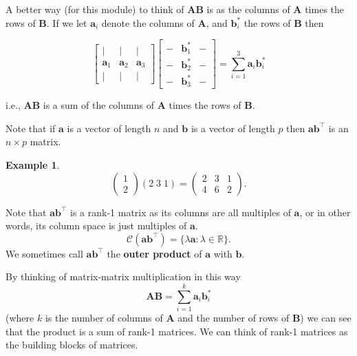 \documentclass[
]{book}
\theoremstyle{definition}
\theoremstyle{definition}
\newtheorem{example}{Example}[chapter]
\theoremstyle{definition}
\theoremstyle{definition}
\theoremstyle{remark}
\begin{document}
A better way (for this module) to think of \(\mathbf A\mathbf B\) is as the columns of \(\mathbf A\) times the rows of \(\mathbf B\). If we let \(\mathbf a_i\) denote the columns of \(\mathbf A\), and \(\mathbf b^*_i\) the rows of \(\mathbf B\) then

\[\left[ \begin{array}{ccc}
| & | &|\\
\mathbf a_{1}&\mathbf a_{2}&\mathbf a_{3}\\
| & | &|
\end{array}
\right]\left[\begin{array}{ccc}
- & \mathbf b_{1}^* &-\\
-&\mathbf b_{2}^*&-\\
- & \mathbf b_{3}^* &-
\end{array}
\right]=\sum_{i=1}^3\mathbf a_i \mathbf b_i^*\]

i.e., \(\mathbf A\mathbf B\) is a sum of the columns of \(\mathbf A\) times the rows of \(\mathbf B\).

Note that if \(\mathbf a\) is a vector of length \(n\) and \(\mathbf b\) is a vector of length \(p\) then
\(\mathbf a\mathbf b^\top\) is an \(n\times p\) matrix.

\begin{example}
\protect\hypertarget{exm:unnamed-chunk-1}{}\label{exm:unnamed-chunk-1}\[\left( 
  \begin{array}{c}
1\\
2\end{array}
\right)
\left(2 \; 3\; 1\right)=
  \left(\begin{array}{ccc}
                                      2&3&1\\
                                      4&6&2
                                      \end{array}
                                      \right).
  \]
\end{example}

Note that \(\mathbf a\mathbf b^\top\) is a rank-1 matrix as its columns are all multiples of \(\mathbf a\), or in other words, its column space is just multiples of \(\mathbf a\).
\[\mathcal{C}(\mathbf a\mathbf b^\top) = \{\lambda \mathbf a: \lambda \in \mathbb{R}\}.\]
We sometimes call \(\mathbf a\mathbf b^\top\) the \textbf{outer product} of \(\mathbf a\) with \(\mathbf b\).

By thinking of matrix-matrix multiplication in this way
\[\mathbf A\mathbf B=\sum_{i=1}^k \mathbf a_i \mathbf b_i^*\]
(where \(k\) is the number of columns of \(\mathbf A\) and the number of rows of \(\mathbf B\))
we can see that the product is a sum of rank-1 matrices.
We can think of rank-1 matrices as the building blocks of matrices.
\end{document}
